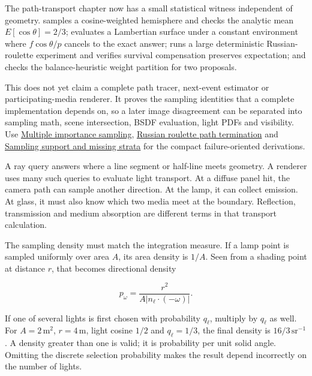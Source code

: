 \hypertarget{03-visual-computing-i-ch007-reconstruction-checkpoint-isolate-estimator-invariants-before-tracing-a-scene}{}

The path-transport chapter now has a small statistical witness independent of geometry.  samples a cosine-weighted hemisphere and checks the analytic mean \(E[\cos\theta]=2/3\); evaluates a Lambertian surface under a constant environment where \(f\cos\theta/p\) cancels to the exact answer; runs a large deterministic Russian-roulette experiment and verifies survival compensation preserves expectation; and checks the balance-heuristic weight partition for two proposals.

This does not yet claim a complete path tracer, next-event estimator or participating-media renderer. It proves the sampling identities that a complete implementation depends on, so a later image disagreement can be separated into sampling math, scene intersection, BSDF evaluation, light PDFs and visibility. Use \hyperref[appendix-ca8898faf1a6]{Multiple importance sampling}, \hyperref[appendix-7277c62d4599]{Russian roulette path termination} and \hyperref[appendix-10308c3d753e]{Sampling support and missing strata} for the compact failure-oriented derivations.

A ray query answers where a line segment or half-line meets geometry. A renderer uses many such queries to evaluate light transport. At a diffuse panel hit, the camera path can sample another direction. At the lamp, it can collect emission. At glass, it must also know which two media meet at the boundary. Reflection, transmission and medium absorption are different terms in that transport calculation.

The sampling density must match the integration measure. If a lamp point is sampled uniformly over area \(A\), its area density is \(1/A\). Seen from a shading point at distance \(r\), that becomes directional density

\[
p_\omega=\frac{r^2}{A\lvert n_\ell\cdot(-\omega)\rvert}.
\]

If one of several lights is first chosen with probability \(q_\ell\), multiply by \(q_\ell\) as well. For \(A=2\,\mathrm{m^2}\), \(r=4\,\mathrm m\), light cosine \(1/2\) and \(q_\ell=1/3\), the final density is \(16/3\,\mathrm{sr}^{-1}\). A density greater than one is valid; it is probability per unit solid angle. Omitting the discrete selection probability makes the result depend incorrectly on the number of lights.

